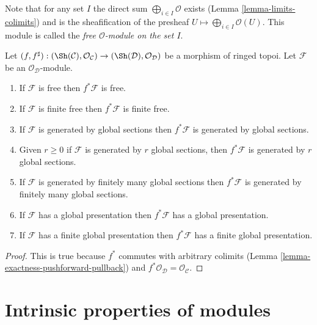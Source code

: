 \noindent
Note that for any set $I$ the direct sum
$\bigoplus_{i \in I} \mathcal{O}$ exists
(Lemma \ref{lemma-limits-colimits})
and is the sheafification of the presheaf
$U \mapsto \bigoplus_{i \in I} \mathcal{O}(U)$.
This module is called the {\it free $\mathcal{O}$-module on the set $I$}.

\begin{lemma}
\label{lemma-global-pullback}
Let
$(f, f^\sharp) :
(\Sh(\mathcal{C}), \mathcal{O}_\mathcal{C})
\to
(\Sh(\mathcal{D}), \mathcal{O}_\mathcal{D})$
be a morphism of ringed topoi.
Let $\mathcal{F}$ be an $\mathcal{O}_\mathcal{D}$-module.
\begin{enumerate}
\item If $\mathcal{F}$ is free then $f^*\mathcal{F}$ is free.
\item If $\mathcal{F}$ is finite free then $f^*\mathcal{F}$ is finite free.
\item If $\mathcal{F}$ is generated by global sections
then $f^*\mathcal{F}$ is generated by global sections.
\item Given $r \geq 0$ if $\mathcal{F}$ is generated by $r$ global
sections, then $f^*\mathcal{F}$ is generated by $r$ global sections.
\item If $\mathcal{F}$ is generated by finitely many global sections
then $f^*\mathcal{F}$ is generated by finitely many global sections.
\item If $\mathcal{F}$ has a global presentation then
$f^*\mathcal{F}$ has a global presentation.
\item If $\mathcal{F}$ has a finite global presentation
then $f^*\mathcal{F}$ has a finite global presentation.
\end{enumerate}
\end{lemma}

\begin{proof}
This is true because $f^*$ commutes with arbitrary colimits
(Lemma \ref{lemma-exactness-pushforward-pullback})
and $f^*\mathcal{O}_\mathcal{D} = \mathcal{O}_\mathcal{C}$.
\end{proof}






\section{Intrinsic properties of modules}
\label{section-intrinsic}

